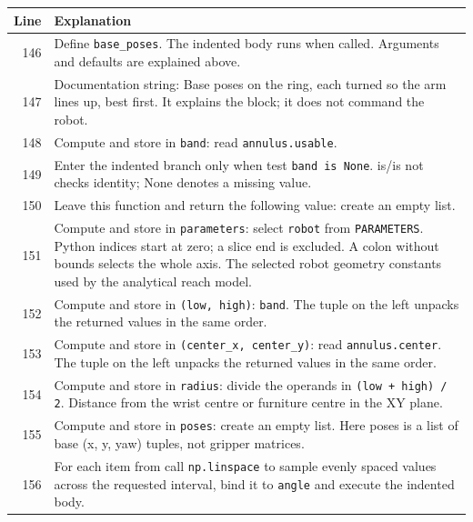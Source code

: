 \documentclass[11pt,a4paper]{book}
\begin{document}
\begin{longtable}{r p{}}

\textbf{Line} & \textbf{Explanation} \\ \hline \endhead

146 & Define \texttt{base\_poses}. The indented body runs when called. Arguments and defaults are explained above. \\

147 & Documentation string: Base poses on the ring, each turned so the arm lines up, best first. It explains the block; it does not command the robot. \\

148 & Compute and store in \texttt{band}: read \texttt{annulus.usable}.  \\

149 & Enter the indented branch only when test \texttt{band is None}. is/is not checks identity; None denotes a missing value. \\

150 & Leave this function and return the following value: create an empty list. \\

151 & Compute and store in \texttt{parameters}: select \texttt{robot} from \texttt{PARAMETERS}. Python indices start at zero; a slice end is excluded. A colon without bounds selects the whole axis. The selected robot geometry constants used by the analytical reach model. \\

152 & Compute and store in \texttt{(low, high)}: \texttt{band}. The tuple on the left unpacks the returned values in the same order. \\

153 & Compute and store in \texttt{(center\_x, center\_y)}: read \texttt{annulus.center}. The tuple on the left unpacks the returned values in the same order. \\

154 & Compute and store in \texttt{radius}: divide the operands in \texttt{(low + high) / 2}. Distance from the wrist centre or furniture centre in the XY plane. \\

155 & Compute and store in \texttt{poses}: create an empty list. Here poses is a list of base (x, y, yaw) tuples, not gripper matrices. \\

156 & For each item from call \texttt{np.linspace} to sample evenly spaced values across the requested interval, bind it to \texttt{angle} and execute the indented body. \\


\end{longtable}
\end{document}
